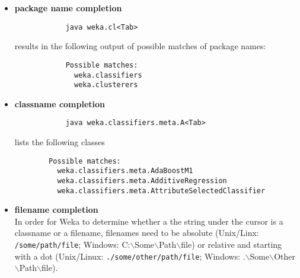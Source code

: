 \begin{itemize}
	\item \textbf{package name completion}
		\begin{verbatim}
			java weka.cl<Tab>
		\end{verbatim}
		results in the following output of possible matches of package names:
		\begin{verbatim}
			Possible matches:
			  weka.classifiers
			  weka.clusterers
		\end{verbatim}
	\item \textbf{classname completion}
		\begin{verbatim}
			java weka.classifiers.meta.A<Tab>
		\end{verbatim}
		lists the following classes
		\begin{verbatim}
		Possible matches:
		  weka.classifiers.meta.AdaBoostM1
		  weka.classifiers.meta.AdditiveRegression
		  weka.classifiers.meta.AttributeSelectedClassifier
		\end{verbatim}
	\item \textbf{filename completion} \\
	      In order for Weka to determine whether a the string under the cursor is a classname or a filename, filenames need to be absolute (Unix/Linx: \texttt{/some/path/file}; Windows: C:$\backslash$Some$\backslash$Path$\backslash$file) or relative and starting with a dot (Unix/Linux: \texttt{./some/other/path/file}; Windows: .$\backslash$Some$\backslash$Other$\backslash$Path$\backslash$file).
\end{itemize}

